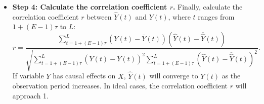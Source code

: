 \begin{itemize}
    \item \textbf{Step 4: Calculate the correlation coefficient \( r \).}  
    Finally, calculate the correlation coefficient \( r \) between \( \hat{Y}(t) \) and \( Y(t) \), where \( t \) ranges from \( 1+(E-1)\tau \) to \( L \):
    \begingroup
\footnotesize
\begin{equation}
    r = \frac{\sum_{t=1+(E-1)\tau}^L \left( Y(t) - \overline{Y}(t) \right) \left( \hat{Y}(t) - \overline{\hat{Y}}(t) \right)}
    {\sqrt{\sum_{t=1+(E-1)\tau}^L \left( Y(t) - \overline{Y}(t) \right)^2 \sum_{t=1+(E-1)\tau}^L \left( \hat{Y}(t) - \overline{\hat{Y}}(t) \right)^2}}.
\nonumber
\end{equation}
\endgroup
    If variable \( Y \) has causal effects on \( X \), \( \hat{Y}(t) \) will converge to \( Y(t) \) as the observation period increases. In ideal cases, the correlation coefficient \( r \) will approach 1.
\end{itemize}























